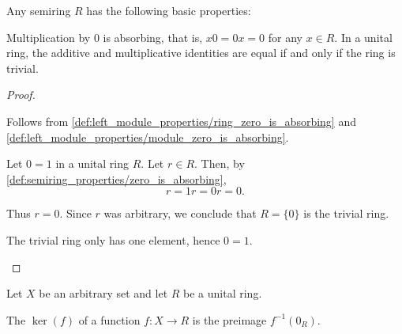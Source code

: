 \begin{proposition}\label{def:semiring_properties}
  Any semiring \( R \) has the following basic properties:
  \begin{defenum}
     Multiplication by \( 0 \) is absorbing, that is, \( x0 = 0x = 0 \) for any \( x \in R \).
     In a unital ring, the additive and multiplicative identities are equal if and only if the ring is trivial.
  \end{defenum}
\end{proposition}
\begin{proof}\mbox{}
  \begin{itemize}
     Follows from \cref{def:left_module_properties/ring_zero_is_absorbing} and \cref{def:left_module_properties/module_zero_is_absorbing}.
    \mbox{}
    \begin{description}
      \Implies Let \( 0 = 1 \) in a unital ring \( R \). Let \( r \in R \). Then, by \cref{def:semiring_properties/zero_is_absorbing},
      \begin{equation*}
        r = 1r = 0r = 0.
      \end{equation*}

      Thus \( r = 0 \). Since \( r \) was arbitrary, we conclude that \( R = \{ 0 \} \) is the trivial ring.

      \ImpliedBy The trivial ring only has one element, hence \( 0 = 1 \).
    \end{description}
  \end{itemize}
\end{proof}

\begin{definition}\label{def:semiring_kernel}
  Let \( X \) be an arbitrary set and let \( R \) be a unital ring.

  The  \( \ker(f) \) of a function \( f: X \to R \) is the preimage \( f^{-1}(0_R) \).
\end{definition}

